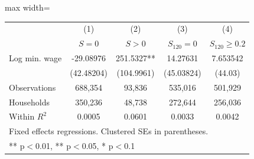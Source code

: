 \begin{adjustbox}{max width=\textwidth}
\begin{tabular}{lcccc}
\toprule
 & (1) & (2) & (3) & (4) \\
 & $S=0$ & $S>0$ & $S_{120}=0$ & $S_{120}\geq 0.2$ \\
\midrule
Log min. wage & -29.08976 & 251.5327** & 14.27631 & 7.653542 \\
 & (42.48204) & (104.9961) & (45.03824) & (44.03) \\
\midrule
Observations & 688,354 & 93,836 & 535,016 & 501,929 \\
Households & 350,236 & 48,738 & 272,644 & 256,036 \\
Within $R^2$ & 0.0005 & 0.0601 & 0.0033 & 0.0042 \\
\bottomrule
\multicolumn{5}{l}{\footnotesize Fixed effects regressions. Clustered SEs in parentheses.} \\
\multicolumn{5}{l}{\footnotesize *** p$<$0.01, ** p$<$0.05, * p$<$0.1} \\
\end{tabular}
\end{adjustbox}
